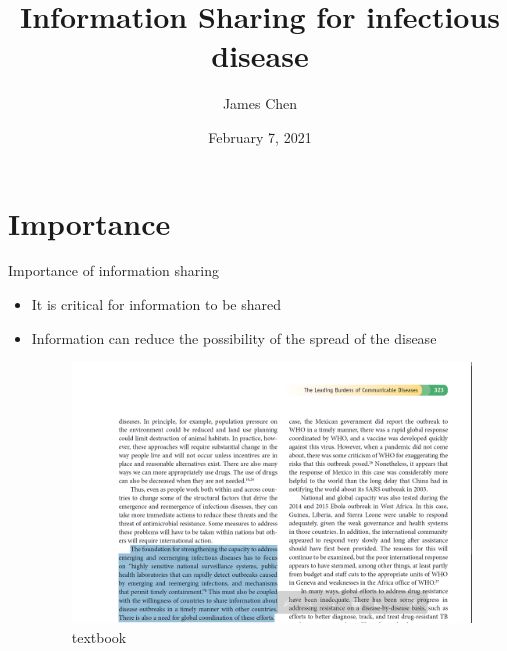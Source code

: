 \documentclass{beamer}
\title[Information Sharing for infectious disease]{Information Sharing for infectious disease}
\author{James Chen}
\institute{NYU Shanghai}
\date{February 7, 2021}
\begin{document}
\begin{frame}
  \titlepage
\end{frame}


\section{Importance}
\begin{frame}{Importance of information sharing}
\begin{itemize}

  \item It is critical for information to be shared 
  \item Information can reduce the possibility of the spread of the disease 
  
\begin{figure}[H]
\centering
\includegraphics[scale=0.375]{textbook.png}
\caption{textbook}
\end{figure}
\citep{skolnik_2015}
\end{itemize}

\end{frame}
\end{document}
